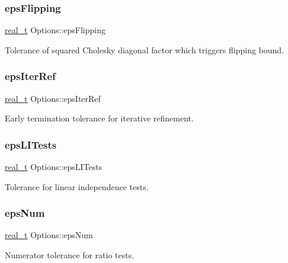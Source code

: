 \subsubsection{\texorpdfstring{eps\+Flipping}{epsFlipping}}
{\footnotesize\ttfamily \hyperlink{qp_o_a_s_e_s__wrapper_8h_a0d00e2b3dfadee81331bbb39068570c4}{real\+\_\+t} Options\+::eps\+Flipping}

Tolerance of squared Cholesky diagonal factor which triggers flipping bound. \mbox{\label{class_options_a8d7b0b4ab3311519b73e0c30a98e7295}} 
\subsubsection{\texorpdfstring{eps\+Iter\+Ref}{epsIterRef}}
{\footnotesize\ttfamily \hyperlink{qp_o_a_s_e_s__wrapper_8h_a0d00e2b3dfadee81331bbb39068570c4}{real\+\_\+t} Options\+::eps\+Iter\+Ref}

Early termination tolerance for iterative refinement. \mbox{\label{class_options_af972adad4f56f124531725e1248a51e3}} 
\subsubsection{\texorpdfstring{eps\+L\+I\+Tests}{epsLITests}}
{\footnotesize\ttfamily \hyperlink{qp_o_a_s_e_s__wrapper_8h_a0d00e2b3dfadee81331bbb39068570c4}{real\+\_\+t} Options\+::eps\+L\+I\+Tests}

Tolerance for linear independence tests. \mbox{\label{class_options_af655ae1250e2c425b278644163cd3a61}} 
\subsubsection{\texorpdfstring{eps\+Num}{epsNum}}
{\footnotesize\ttfamily \hyperlink{qp_o_a_s_e_s__wrapper_8h_a0d00e2b3dfadee81331bbb39068570c4}{real\+\_\+t} Options\+::eps\+Num}

Numerator tolerance for ratio tests. \mbox{\label{class_options_a636e3942e0ad78b9c4914541a20b70d0}} 
